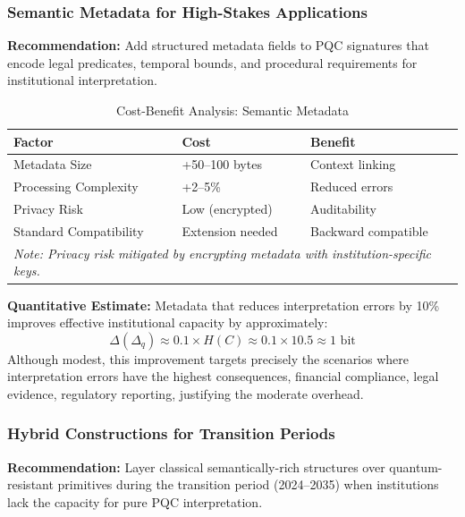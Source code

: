 \documentclass{ieeeaccess}
\begin{document}
\subsubsection{Semantic Metadata for High-Stakes Applications}

\textbf{Recommendation:} Add structured metadata fields to PQC signatures that 
encode legal predicates, temporal bounds, and procedural requirements for 
institutional interpretation.

\begin{table}[h]
\centering
\caption{Cost-Benefit Analysis: Semantic Metadata}
\label{tab:metadata}
\small
\setlength{\tabcolsep}{3pt}
\begin{tabular}{p{3.0cm}p{2.2cm}p{2.2cm}}
\toprule
\textbf{Factor} & \textbf{Cost} & \textbf{Benefit} \\
\midrule
Metadata Size & +50--100 bytes & Context linking \\
Processing Complexity & +2--5\% & Reduced errors \\
Privacy Risk & Low (encrypted) & Auditability \\
Standard Compatibility & Extension needed & Backward compatible \\
\midrule
\multicolumn{3}{p{7.4cm}}{\footnotesize \textit{Note: Privacy risk mitigated by encrypting metadata with institution-specific keys.}} \\
\bottomrule
\end{tabular}
\end{table}

\textbf{Quantitative Estimate:} Metadata that reduces interpretation errors by 
10\% improves effective institutional capacity by approximately:
\begin{equation}
    \Delta(\Delta_q) \approx 0.1 \times H(C) \approx 0.1 \times 10.5 \approx 1 \text{ bit}
\end{equation}
Although modest, this improvement targets precisely the scenarios where interpretation 
errors have the highest consequences, financial compliance, legal evidence, 
regulatory reporting, justifying the moderate overhead.

\subsubsection{Hybrid Constructions for Transition Periods}

\textbf{Recommendation:} Layer classical semantically-rich structures over 
quantum-resistant primitives during the transition period (2024--2035) when 
institutions lack the capacity for pure PQC interpretation.
\end{document}
